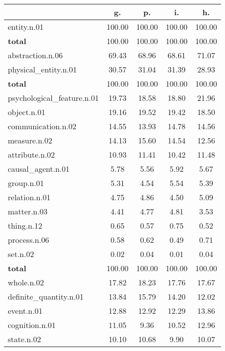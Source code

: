 \begin{table}[h!]
\begin{center}
\begin{tabular}{| l || c | c | c | c |}\hline
 & {\bf g.} & {\bf p.} & {\bf i.} & {\bf h.} \\\hline\hline
entity.n.01 & 100.00  & 100.00  & 100.00  & 100.00 \\\hline\hline
{{\bf total}} & 100.00  & 100.00  & 100.00  & 100.00 \\\hline\hline\hline
abstraction.n.06 & 69.43  & 68.96  & 68.61  & 71.07 \\\hline
physical\_entity.n.01 & 30.57  & 31.04  & 31.39  & 28.93 \\\hline\hline
{{\bf total}} & 100.00  & 100.00  & 100.00  & 100.00 \\\hline\hline\hline
psychological\_feature.n.01 & 19.73  & 18.58  & 18.80  & 21.96 \\\hline
object.n.01 & 19.16  & 19.52  & 19.42  & 18.50 \\\hline
communication.n.02 & 14.55  & 13.93  & 14.78  & 14.56 \\\hline
measure.n.02 & 14.13  & 15.60  & 14.54  & 12.56 \\\hline
attribute.n.02 & 10.93  & 11.41  & 10.42  & 11.48 \\\hline
causal\_agent.n.01 & 5.78  & 5.56  & 5.92  & 5.67 \\\hline
group.n.01 & 5.31  & 4.54  & 5.54  & 5.39 \\\hline
relation.n.01 & 4.75  & 4.86  & 4.50  & 5.09 \\\hline
matter.n.03 & 4.41  & 4.77  & 4.81  & 3.53 \\\hline
thing.n.12 & 0.65  & 0.57  & 0.75  & 0.52 \\\hline
process.n.06 & 0.58  & 0.62  & 0.49  & 0.71 \\\hline
set.n.02 & 0.02  & 0.04  & 0.01  & 0.04 \\\hline\hline
{{\bf total}} & 100.00  & 100.00  & 100.00  & 100.00 \\\hline\hline\hline
whole.n.02 & 17.82  & 18.23  & 17.76  & 17.67 \\\hline
definite\_quantity.n.01 & 13.84  & 15.79  & 14.20  & 12.02 \\\hline
event.n.01 & 12.88  & 12.92  & 12.29  & 13.86 \\\hline
cognition.n.01 & 11.05  & 9.36  & 10.52  & 12.96 \\\hline
state.n.02 & 10.10  & 10.68  & 9.90  & 10.07 \\\hline

\end{tabular}
\end{center}
\end{table}

